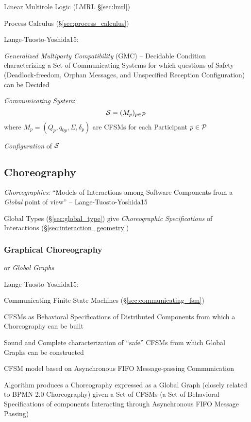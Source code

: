 Linear Multirole Logic (LMRL \S\ref{sec:lmrl})

\fist Process Calculus (\S\ref{sec:process_calculus})

Lange-Tuosto-Yoshida15:

\emph{Generalized Multiparty Compatibility} (GMC) -- Decidable
Condition characterizing a Set of Communicating Systems for which
questions of Safety (Deadlock-freedom, Orphan Messages, and
Unspecified Reception Configuration) can be Decided

\emph{Communicating System}:
\[
  \mathcal{S} = (M_p)_{p \in \mathcal{P}}
\]
where $M_p = (Q_p, q_{0p}, \Sigma, \delta_p)$ are CFSMs for each
Participant $p \in \mathcal{P}$

\emph{Configuration} of $\mathcal{S}$ %



\subsection{Choreography}\label{sec:choreography}

\emph{Choreographies}: ``Models of Interactions among Software
Components from a \emph{Global} point of view'' --
Lange-Tuosto-Yoshida15

\fist Global Types (\S\ref{sec:global_type}) give \emph{Choreographic
  Specifications} of Interactions (\S\ref{sec:interaction_geometry})



\subsubsection{Graphical Choreography}\label{sec:graphical_choreography}

or \emph{Global Graphs}

Lange-Tuosto-Yoshida15:

Communicating Finite State Machines (\S\ref{sec:communicating_fsm})

CFSMs as Behavioral Specifications of Distributed Components from
which a Choreography can be built

Sound and Complete characterization of ``safe'' CFSMs from which
Global Graphs can be constructed

CFSM model based on Asynchronous FIFO Message-passing Communication

Algorithm produces a Choreography expressed as a Global Graph (closely
related to BPMN 2.0 Choreography) given a Set of CFSMs (a Set of
Behavioral Specifications of components Interacting through
Asynchronous FIFO Message Passing)

